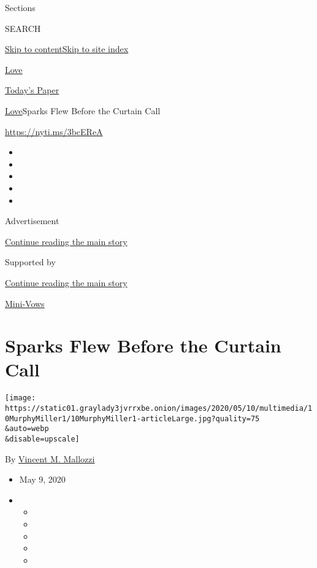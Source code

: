Sections

SEARCH

\protect\hyperlink{site-content}{Skip to
content}\protect\hyperlink{site-index}{Skip to site index}

\href{https://www.nytimes3xbfgragh.onion/section/fashion/weddings}{Love}

\href{https://myaccount.nytimes3xbfgragh.onion/auth/login?response_type=cookie\&client_id=vi}{}

\href{https://www.nytimes3xbfgragh.onion/section/todayspaper}{Today's
Paper}

\href{/section/fashion/weddings}{Love}\textbar{}Sparks Flew Before the
Curtain Call

\url{https://nyti.ms/3bcEReA}

\begin{itemize}
\item
\item
\item
\item
\item
\end{itemize}

Advertisement

\protect\hyperlink{after-top}{Continue reading the main story}

Supported by

\protect\hyperlink{after-sponsor}{Continue reading the main story}

\href{/column/mini-vows}{Mini-Vows}

\hypertarget{sparks-flew-before-the-curtain-call}{%
\section{Sparks Flew Before the Curtain
Call}\label{sparks-flew-before-the-curtain-call}}

\texttt{[image: https://static01.graylady3jvrrxbe.onion/images/2020/05/10/multimedia/10MurphyMiller1/10MurphyMiller1-articleLarge.jpg?quality=75\\\&auto=webp\\\&disable=upscale]}

By
\href{https://www.nytimes3xbfgragh.onion/by/vincent-m-mallozzi}{Vincent
M. Mallozzi}

\begin{itemize}
\item
  May 9, 2020
\item
  \begin{itemize}
  \item
  \item
  \item
  \item
  \item
  \end{itemize}
\end{itemize}

